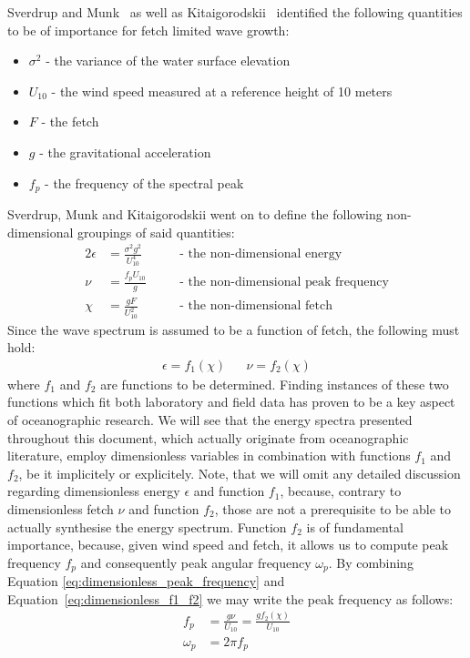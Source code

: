 Sverdrup and Munk~\cite{report:SverdrupMunk1947} as well as
Kitaigorodskii~\cite{article:Kitaigorodskii1962}\cite{book:Kitaigorodskii1970} 
identified the following quantities to be of importance for fetch limited wave
growth:
\begin{itemize}
 \item $\sigma^2$ - the variance of the water surface elevation
 \item $U_{10}$ - the wind speed measured at a reference height of 10 meters
 \item $F$ - the fetch
 \item $g$ - the gravitational acceleration
 \item $f_p$ - the frequency of the spectral peak
\end{itemize}
Sverdrup, Munk and Kitaigorodskii went on to define the following
non-dimensional groupings of said quantities:
\begin{alignat}{2}
 \epsilon &= \frac{\sigma^2 g^2}{U_{10}^{4}} \quad && \text{- the 
non-dimensional energy}\\
 \nu &= \frac{f_p U_{10}}{g} \quad && \text{- the non-dimensional peak 
frequency} \label{eq:dimensionless_peak_frequency} \\
 \chi &= \frac{gF}{U_{10}^{2}} \quad && \text{- the non-dimensional fetch} 
\label{eq:dimensionless_fetch}
\end{alignat}
Since the wave spectrum is assumed to be a function of fetch, the following 
must hold: 
\begin{align}
\label{eq:dimensionless_f1_f2}
 \epsilon = f_1(\chi) && \nu = f_2(\chi)
\end{align}
where $f_1$ and $f_2$ are functions to be determined. Finding instances of 
these two functions which fit both laboratory and field data has proven to be a 
key aspect of oceanographic research. We will see that the energy spectra
presented throughout this document, which actually originate from oceanographic
literature, employ dimensionless variables in combination with functions $f_1$
and $f_2$, be it implicitely or explicitely. Note, that we will omit any
detailed discussion regarding dimensionless energy $\epsilon$ and function
$f_1$, because, contrary to dimensionless fetch $\nu$ and function $f_2$, those
are not a prerequisite to be able to actually synthesise the energy spectrum.
Function $f_2$ is of fundamental importance, because, given wind speed and 
fetch, it allows us to compute peak frequency $f_p$ and consequently peak 
angular frequency $\omega_p$. By combining Equation 
\ref{eq:dimensionless_peak_frequency} and Equation~\ref{eq:dimensionless_f1_f2}
we may write the peak frequency as follows:
\begin{align}
 f_p &= \frac{g\nu}{U_{10}} = \frac{gf_2(\chi)}{U_{10}} 
\label{eq:f_p_from_dimensionless}\\
 \omega_p &= 2\pi f_p \label{eq:omega_p_from_dimensionless}
\end{align}
%
